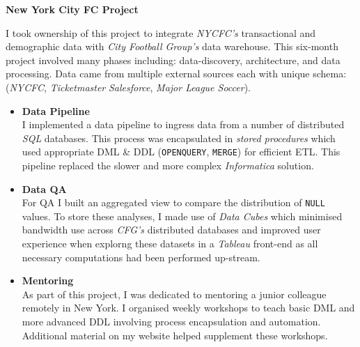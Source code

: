 \documentclass[letterpaper,11pt]{article}
\newcommand{\resumeItem}[3]{
	\item\small{
		\textbf{#1}\hfill\tiny{#2\\}\small{ #3 \vspace{-2pt}}
	}
}
\newcommand{\resumeItemListStart}{\begin{itemize}}
\newcommand{\resumeItemListEnd}{\end{itemize}\vspace{-5pt}}
\begin{document}
	\resumeItem{New York City FC Project}{}
	{
		
		
		I took ownership of this project to integrate \textit{NYCFC's} transactional and demographic data with \textit{City Football Group's} data warehouse. This six-month project involved many phases including: data-discovery, architecture, and data processing. Data came from multiple external sources each with unique schema: (\textit{NYCFC}, \textit{Ticketmaster} \textit{Salesforce}, \textit{Major League Soccer}). 		
	\resumeItemListStart
		
		\resumeItem{Data Pipeline}{}
		{
			I implemented a data pipeline to ingress data from a number of distributed \textit{SQL} databases.
			This process was encapsulated in \textit{stored procedures} which used appropriate DML \& DDL (\texttt{OPENQUERY}, \texttt{MERGE}) for efficient ETL.
			\newline
			This pipeline replaced the slower and more complex \textit{Informatica} solution.
			\newline
		}	
		\resumeItem{Data QA}{}
		{
			For QA I built an aggregated view to compare the distribution of \texttt{NULL} values. To store these analyses, I made use of \textit{Data Cubes} which minimised bandwidth use across \textit{CFG's} distributed databases and improved user experience when explorng these datasets in a \textit{Tableau} front-end as all necessary computations had been performed up-stream.
			\newline
		}
		\resumeItem{Mentoring}{}
		{
			As part of this project, I was dedicated to mentoring a junior colleague remotely in New York. I organised weekly workshops to teach basic DML and more advanced DDL involving process encapsulation and automation. Additional material on my website helped supplement these workshops.
			\newline
		}
	
	\resumeItemListEnd		
	}
\end{document}

